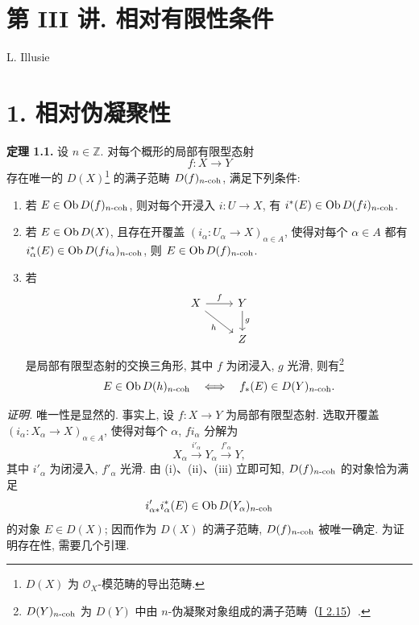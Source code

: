 \section*{第 III 讲. 相对有限性条件}
\begin{center}
L. Illusie
\end{center}

\section*{1. 相对伪凝聚性}

\textbf{定理 1.1.} 设 \(n\in \mathbb Z\). 对每个概形的局部有限型态射
\[
  f:X\longrightarrow Y
\]
存在唯一的 \(D(X)\)\footnote{\(D(X)\) 为 \(\mathcal O_X\)-模范畴的导出范畴.} 的满子范畴 \(D(f)_{n\text{-}\mathrm{coh}}\), 满足下列条件:

\begin{enumerate}[label=(\roman*)]
\item 若 \(E\in \operatorname{Ob} D(f)_{n\text{-}\mathrm{coh}}\), 则对每个开浸入 \(i:U\to X\), 有 \(i^*(E)\in \operatorname{Ob} D(fi)_{n\text{-}\mathrm{coh}}\).

\item 若 \(E\in \operatorname{Ob} D(X)\), 且存在开覆盖 \((i_\alpha:U_\alpha\to X)_{\alpha\in A}\), 使得对每个 \(\alpha\in A\) 都有 \(i_\alpha^*(E)\in \operatorname{Ob} D(fi_\alpha)_{n\text{-}\mathrm{coh}}\), 则 \(E\in \operatorname{Ob} D(f)_{n\text{-}\mathrm{coh}}\).

\item 若
\[
\begin{tikzcd}
X \arrow[r,"f"] \arrow[dr,"h"'] & Y \arrow[d,"g"]\\
& Z
\end{tikzcd}
\]
是局部有限型态射的交换三角形, 其中 \(f\) 为闭浸入, \(g\) 光滑, 则有\footnote{\(D(Y)_{n\text{-}\mathrm{coh}}\) 为 \(D(Y)\) 中由 \(n\)-伪凝聚对象组成的满子范畴（\hyperlink{sga6.e01.ex.2-15}{I 2.15}）.}
\[
  E\in \operatorname{Ob} D(h)_{n\text{-}\mathrm{coh}}
  \quad\Longleftrightarrow\quad
  f_*(E)\in D(Y)_{n\text{-}\mathrm{coh}}.
\]
\end{enumerate}

\emph{证明.} 唯一性是显然的. 事实上, 设 \(f:X\to Y\) 为局部有限型态射. 选取开覆盖 \((i_\alpha:X_\alpha\to X)_{\alpha\in A}\), 使得对每个 \(\alpha\), \(fi_\alpha\) 分解为
\[
  X_\alpha \xrightarrow{i'_\alpha} Y_\alpha \xrightarrow{f'_\alpha} Y,
\]
其中 \(i'_\alpha\) 为闭浸入, \(f'_\alpha\) 光滑. 由 (i)、(ii)、(iii) 立即可知, \(D(f)_{n\text{-}\mathrm{coh}}\) 的对象恰为满足
\[
  i'_{\alpha *}i_\alpha^*(E)\in \operatorname{Ob} D(Y_\alpha)_{n\text{-}\mathrm{coh}}
\]
的对象 \(E\in D(X)\); 因而作为 \(D(X)\) 的满子范畴, \(D(f)_{n\text{-}\mathrm{coh}}\) 被唯一确定. 为证明存在性, 需要几个引理.

